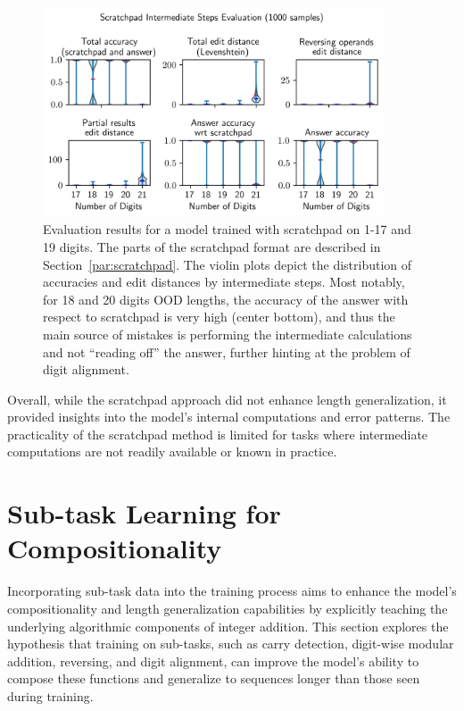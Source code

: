 \begin{figure}[!h]
  \centering
  \includegraphics[width=0.9\textwidth]{fig/scratchpad_eval.png}
  \caption{Evaluation results for a model trained with scratchpad on 1-17 and 19 digits. The parts of the scratchpad format are described in Section~\ref{par:scratchpad}. The violin plots depict the distribution of accuracies and edit distances by intermediate steps. Most notably, for 18 and 20 digits OOD lengths, the accuracy of the answer with respect to scratchpad is very high (center bottom), and thus the main source of mistakes is performing the intermediate calculations and not ``reading off'' the answer, further hinting at the problem of digit alignment.}
  \label{fig:scratchpad_eval}
\end{figure}

Overall, while the scratchpad approach did not enhance length generalization, it provided insights into the model's internal computations and error patterns. The practicality of the scratchpad method is limited for tasks where intermediate computations are not readily available or known in practice.

\section{Sub-task Learning for Compositionality}\label{sec:subtask_learning}

Incorporating sub-task data into the training process aims to enhance the model's compositionality and length generalization capabilities by explicitly teaching the underlying algorithmic components of integer addition. This section explores the hypothesis that training on sub-tasks, such as carry detection, digit-wise modular addition, reversing, and digit alignment, can improve the model's ability to compose these functions and generalize to sequences longer than those seen during training.

